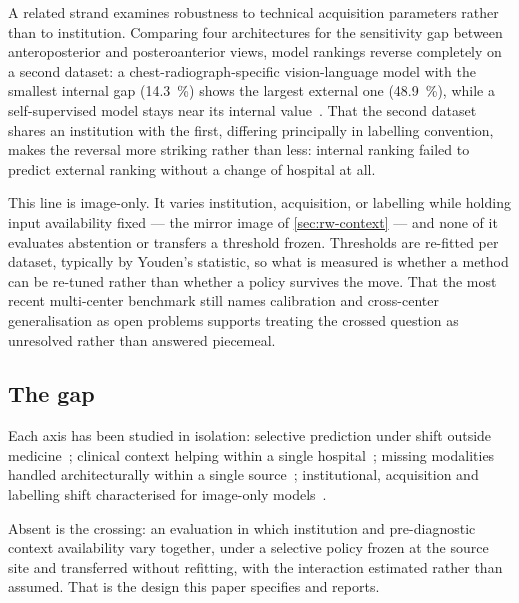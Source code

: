 A related strand examines robustness to technical acquisition parameters rather
than to institution. Comparing four architectures for the sensitivity gap
between anteroposterior and posteroanterior views, model rankings reverse
completely on a second dataset: a chest-radiograph-specific vision-language
model with the smallest internal gap (\SI{14.3}{\percent}) shows the largest
external one (\SI{48.9}{\percent}), while a self-supervised model stays near
its internal value~\cite{farquhar2026acquisition}. That the second dataset
shares an institution with the first, differing principally in labelling
convention, makes the reversal more striking rather than less: internal ranking
failed to predict external ranking without a change of hospital at all.

This line is image-only. It varies institution, acquisition, or labelling while
holding input availability fixed --- the mirror image of
\cref{sec:rw-context} --- and none of it evaluates abstention or transfers a
threshold frozen. Thresholds are re-fitted per dataset, typically by Youden's
statistic, so what is measured is whether a method can be re-tuned rather than
whether a policy survives the move. That the most recent multi-center benchmark
still names calibration and cross-center generalisation as open problems
supports treating the crossed question as unresolved rather than answered
piecemeal.

\subsection{The gap}

Each axis has been studied in isolation: selective prediction under shift
outside medicine~\cite{selective_shift_2025}; clinical context helping within a
single hospital~\cite{yang2025mcxnet,sloan2025clinically}; missing modalities
handled architecturally within a single
source~\cite{wang2025missing,wang2025moehealth}; institutional, acquisition and
labelling shift characterised for image-only
models~\cite{cohen2020limits,cxrlt2026,farquhar2026acquisition}.

Absent is the crossing: an evaluation in which institution and pre-diagnostic
context availability vary together, under a selective policy frozen at the
source site and transferred without refitting, with the interaction estimated
rather than assumed. That is the design this paper specifies and reports.

